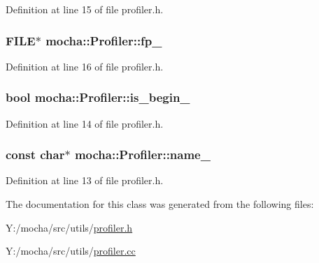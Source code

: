 Definition at line 15 of file profiler.h.

\hypertarget{classmocha_1_1_profiler_a680e138ef21bf5fa33c7bd403bcd655d}{
\subsubsection[{fp\_\-}]{\setlength{\rightskip}{0pt plus 5cm}FILE$\ast$ {\bf mocha::Profiler::fp\_\-}}}
\label{classmocha_1_1_profiler_a680e138ef21bf5fa33c7bd403bcd655d}


Definition at line 16 of file profiler.h.

\hypertarget{classmocha_1_1_profiler_a3d310dcf2156eba73e8417298276bfd3}{
\subsubsection[{is\_\-begin\_\-}]{\setlength{\rightskip}{0pt plus 5cm}bool {\bf mocha::Profiler::is\_\-begin\_\-}}}
\label{classmocha_1_1_profiler_a3d310dcf2156eba73e8417298276bfd3}


Definition at line 14 of file profiler.h.

\hypertarget{classmocha_1_1_profiler_a366afa77a22373b756d86a94fc87b9ff}{
\subsubsection[{name\_\-}]{\setlength{\rightskip}{0pt plus 5cm}const char$\ast$ {\bf mocha::Profiler::name\_\-}}}
\label{classmocha_1_1_profiler_a366afa77a22373b756d86a94fc87b9ff}


Definition at line 13 of file profiler.h.



The documentation for this class was generated from the following files:\begin{DoxyCompactItemize}
\item 
Y:/mocha/src/utils/\hyperlink{profiler_8h}{profiler.h}\item 
Y:/mocha/src/utils/\hyperlink{profiler_8cc}{profiler.cc}\end{DoxyCompactItemize}
